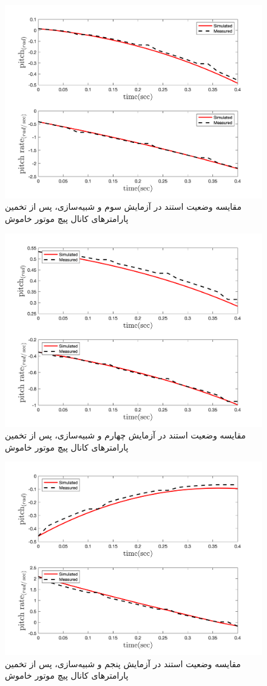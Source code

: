 \begin{figure}[H]
	\includegraphics[width=12cm]{../../Figures/RCP/pitch_ml_parameter_estimation/RCP_pitch_S3.png}
	\centering
	\caption{مقايسه وضعیت استند در  آزمايش سوم و شبیه‌سازی، پس از تخمین پارامترهای کانال پیچ موتور خاموش}
	\label{pitch_ml_ps3}
\end{figure}
\begin{figure}[H]
	\includegraphics[width=12cm]{../../Figures/RCP/pitch_ml_parameter_estimation/RCP_pitch_S4.png}
	\centering
	\caption{مقايسه وضعیت استند در  آزمايش چهارم و شبیه‌سازی، پس از تخمین پارامترهای کانال پیچ موتور خاموش}
	\label{pitch_ml_ps4}
\end{figure}
\begin{figure}[H]
	\includegraphics[width=12cm]{../../Figures/RCP/pitch_ml_parameter_estimation/RCP_pitch_S5.png}
	\centering
	\caption{مقايسه وضعیت استند در  آزمايش پنجم و شبیه‌سازی، پس از تخمین پارامترهای کانال پیچ موتور خاموش}
	\label{pitch_ml_ps5}
\end{figure}
